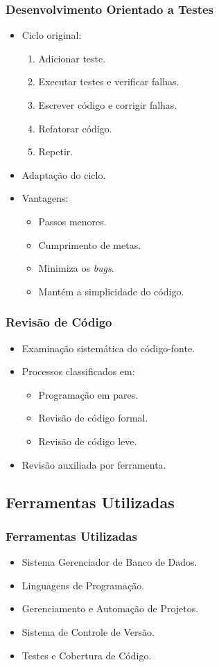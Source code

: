 {
\frametitle{Desenvolvimento Orientado a Testes}
\begin{itemize}
	\item Ciclo original:
	\begin{enumerate}
		\item Adicionar teste.
		\item Executar testes e verificar falhas.
		\item Escrever código e corrigir falhas.
		\item Refatorar código.
		\item Repetir.
	\end{enumerate}
	\item Adaptação do ciclo.
	\item Vantagens:
	\begin{itemize}
		\item Passos menores.
		\item Cumprimento de metas.
		\item Minimiza os \emph{bugs}.
		\item Mantém a simplicidade do código.
	\end{itemize}
\end{itemize}
}
\frame
{
\frametitle{Revisão de Código}
\begin{itemize}
	\item Examinação sistemática do código-fonte.
	\item Processos classificados em:
	\begin{itemize}
		\item Programação em pares.
		\item Revisão de código formal.
		\item Revisão de código leve.
	\end{itemize}
	\item Revisão auxiliada por ferramenta.
\end{itemize}
}

\subsection{Ferramentas Utilizadas}
\frame
{
\frametitle{Ferramentas Utilizadas}
\begin{itemize}
	\item Sistema Gerenciador de Banco de Dados.
	\item Linguagens de Programação.
	\item Gerenciamento e Automação de Projetos.
	\item Sistema de Controle de Versão.
	\item Testes e Cobertura de Código.
\end{itemize}
}

